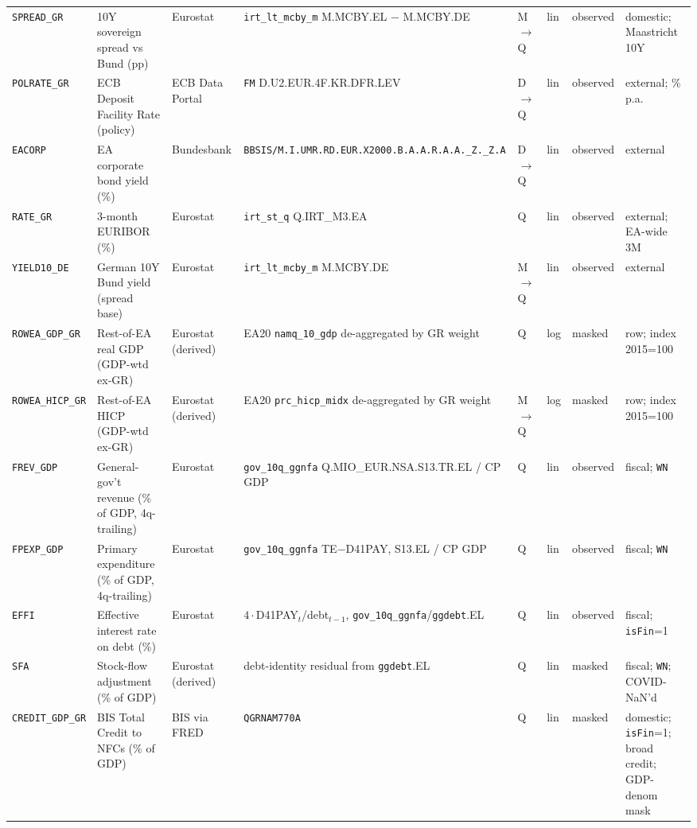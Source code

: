 \begin{longtable}{@{}p{}p{}p{}p{}p{}p{}p{}p{}@{}}
\texttt{SPREAD\_GR}& 10Y sovereign spread vs Bund (pp) & Eurostat & \texttt{irt\_lt\_mcby\_m} M.MCBY.EL $-$ M.MCBY.DE & M$\to$Q & lin & observed & domestic; Maastricht 10Y \\
\texttt{POLRATE\_GR}& ECB Deposit Facility Rate (policy) & ECB Data Portal & \texttt{FM} D.\allowbreak U2.\allowbreak EUR.\allowbreak 4F.\allowbreak KR.\allowbreak DFR.\allowbreak LEV & D$\to$Q & lin & observed & external; \% p.a. \\
\texttt{EACORP}    & EA corporate bond yield (\%) & Bundesbank & \texttt{BBSIS/\allowbreak M.\allowbreak I.\allowbreak UMR.\allowbreak RD.\allowbreak EUR.\allowbreak X2000.\allowbreak B.A.A.\allowbreak R.A.A.\allowbreak \_Z.\_Z.A} & D$\to$Q & lin & observed & external \\
\texttt{RATE\_GR}  & 3-month EURIBOR (\%) & Eurostat & \texttt{irt\_st\_q} Q.IRT\_M3.EA & Q & lin & observed & external; EA-wide 3M \\
\texttt{YIELD10\_DE}& German 10Y Bund yield (spread base) & Eurostat & \texttt{irt\_lt\_mcby\_m} M.MCBY.DE & M$\to$Q & lin & observed & external \\
\texttt{ROWEA\_GDP\_GR}  & Rest-of-EA real GDP (GDP-wtd ex-GR) & Eurostat (derived) & EA20 \texttt{namq\_10\_gdp} de-aggregated by GR weight & Q & log & masked & row; index 2015=100 \\
\texttt{ROWEA\_HICP\_GR} & Rest-of-EA HICP (GDP-wtd ex-GR) & Eurostat (derived) & EA20 \texttt{prc\_hicp\_midx} de-aggregated by GR weight & M$\to$Q & log & masked & row; index 2015=100 \\
\texttt{FREV\_GDP} & General-gov't revenue (\% of GDP, 4q-trailing) & Eurostat & \texttt{gov\_10q\_ggnfa} Q.\allowbreak MIO\_EUR.\allowbreak NSA.\allowbreak S13.\allowbreak TR.\allowbreak EL / CP GDP & Q & lin & observed & fiscal; \texttt{WN} \\
\texttt{FPEXP\_GDP}& Primary expenditure (\% of GDP, 4q-trailing) & Eurostat & \texttt{gov\_10q\_ggnfa} TE$-$D41PAY, S13.EL / CP GDP & Q & lin & observed & fiscal; \texttt{WN} \\
\texttt{EFFI}      & Effective interest rate on debt (\%) & Eurostat & $4\cdot$D41PAY$_t$/debt$_{t-1}$, \texttt{gov\_10q\_ggnfa}/\texttt{ggdebt}.EL & Q & lin & observed & fiscal; \texttt{isFin}=1 \\
\texttt{SFA}       & Stock-flow adjustment (\% of GDP) & Eurostat (derived) & debt-identity residual from \texttt{ggdebt}.EL & Q & lin & masked & fiscal; \texttt{WN}; COVID-NaN'd \\
\texttt{CREDIT\_GDP\_GR} & BIS Total Credit to NFCs (\% of GDP) & BIS via FRED & \texttt{QGRNAM770A} & Q & lin & masked & domestic; \texttt{isFin}=1; broad credit; GDP-denom mask \\

\end{longtable}
